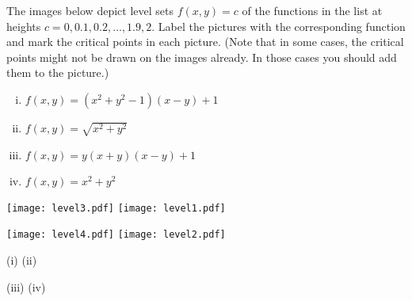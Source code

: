 \begin{question}[M200 2010A] %
The images below depict level sets $f (x, y) = c$ of the functions in the list at heights
$c = 0, 0.1, 0.2, \ldots , 1.9, 2$.
Label the pictures with the corresponding function and mark the critical points in each
picture. (Note that in some cases, the critical points might not be drawn on the images
already. In those cases you should add them to the picture.)
\begin{enumerate}[(i)]
\item
$f(x, y) = (x^2 + y^2 - 1)(x - y) + 1$
\item
$f(x, y) = \sqrt{x^2 + y^2}$
\item
$f(x, y) = y(x + y)(x - y) + 1$
\item
$f(x, y) = x^2 + y^2$
\end{enumerate}

\begin{center}
  \texttt{[image: level3.pdf]}
\quad
  \texttt{[image: level1.pdf]}
\end{center}
\begin{center}
  \texttt{[image: level4.pdf]}
\quad
  \texttt{[image: level2.pdf]}
\end{center}
\end{question}

%

\begin{answer}
\begin{center}
(i)   
\quad
(ii)  
\end{center}
\begin{center}
(iii)   
\quad
(iv)   
\end{center}
\end{answer}

